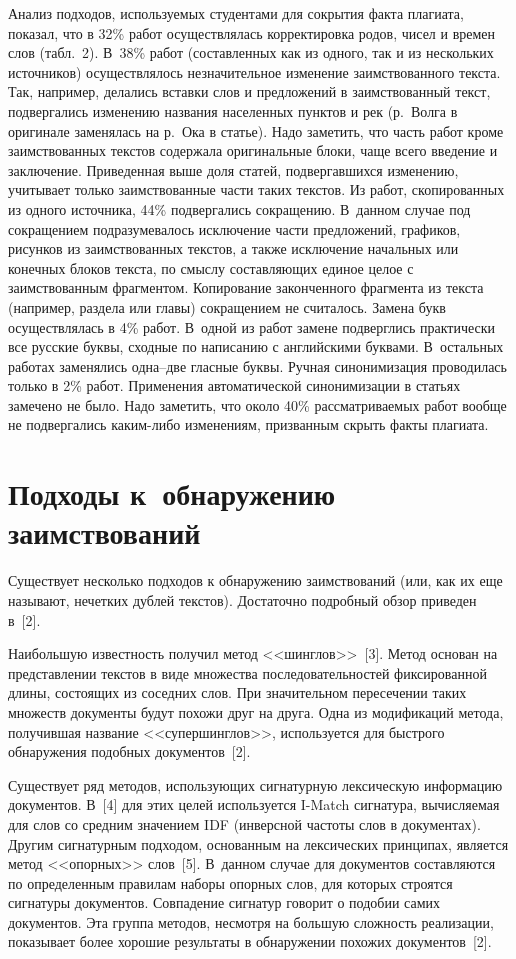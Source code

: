 \begin{multicols}{2}
  Анализ подходов, используемых студентами для сокрытия факта плагиата, 
показал, что в 32\% работ осуществлялась корректировка родов, чисел и времен 
слов (табл.~2). В~38\% работ (составленных как из одного, так и из 
нескольких источников) осуществлялось незначительное изменение 
заимствованного текста. Так, например, делались вставки слов и предложений в 
заимствованный текст, подвергались изменению названия населенных пунктов 
и рек (р.~Волга в оригинале заменялась на р.~Ока в статье). Надо заметить, что 
часть работ кроме заимствованных текстов содержала оригинальные блоки, 
чаще всего введение и заключение. Приведенная выше доля статей, 
подвергавшихся изменению, учитывает только заимствованные части таких 
текстов. Из работ, скопированных из одного источника, 44\% подвергались 
сокращению. В~данном случае под сокращением подразумевалось исключение 
части предложений, графиков, рисунков из заимствованных текстов, а также 
исключение начальных или конечных блоков текста, по смыслу составляющих 
единое целое с заимствованным фрагментом. Копирование законченного 
фрагмента из текста (например, раздела или главы) сокращением не считалось. 
Замена букв осуществлялась в 4\% работ. В~одной из работ замене подверглись 
практически все русские буквы, сходные по написанию с английскими 
буквами. В~остальных работах заменялись одна--две гласные буквы. Ручная 
синонимизация проводилась только в 2\% работ. Применения автоматической 
синонимизации в статьях замечено не было. Надо заметить, что около 40\% 
рассматриваемых работ вообще не подвергались каким-либо изменениям, 
призванным скрыть факты плагиата.



\section{Подходы к~обнаружению заимствований}

  Существует несколько подходов к обнаружению заимствований (или, как их 
еще называют, нечетких дублей текстов). Достаточно подробный обзор 
приведен в~[2].
  
  Наибольшую известность получил метод <<шинглов>>~[3]. Метод основан 
на представлении текстов в виде множества последовательностей 
фиксированной длины, состоящих из соседних слов. При значительном 
пересечении таких множеств документы будут похожи друг на друга. Одна из 
модификаций метода, получившая название <<супершинглов>>, используется 
для быстрого обнаружения подобных документов~[2].
  
  Существует ряд методов, использующих сигнатурную лексическую 
информацию документов. В~[4] для этих целей используется {I-Match} 
сигнатура, вычисляемая для слов со средним значением {IDF} (инверсной 
частоты слов в документах). Другим сигнатурным подходом, основанным на 
лексических принципах, является метод <<опорных>> слов~[5]. В~данном 
случае для документов со\-став\-ля\-ют\-ся по определенным правилам наборы 
опорных слов, для которых строятся сигнатуры документов. Совпадение 
сигнатур говорит о подобии самих документов. Эта группа методов, несмотря 
на большую сложность реализации, показывает более хорошие результаты в 
обнаружении похожих документов~[2].
  

\end{multicols}
